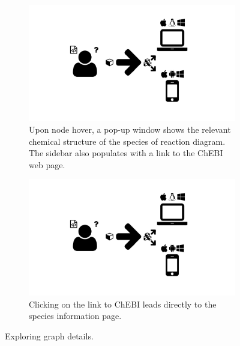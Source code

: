 \begin{figure}
  \centering
  \begin{subfigure}[b]{\textwidth}
    \includegraphics[width=\textwidth, page=8,trim=0.37cm 3.65cm 13.1cm 3.3cm, clip=true]{images/Figures.pdf}
    \caption{Upon node hover, a pop-up window shows the relevant chemical structure of the species of reaction diagram.
      The sidebar also populates with a link to the ChEBI web page.}
    \label{Figure:redox-detail-hover}
  \end{subfigure}
  \begin{subfigure}[b]{\textwidth}
    \includegraphics[width=\textwidth, page=8,trim=13.1cm 3.65cm 0.37cm 3.3cm, clip=true]{images/Figures.pdf}
    \caption{Clicking on the link to ChEBI leads directly to the species information page.}
    \label{Figure:redox-detail-chebi}
  \end{subfigure}
  \caption{Exploring graph details.}
  \label{Figure:redox-detail}
\end{figure}

